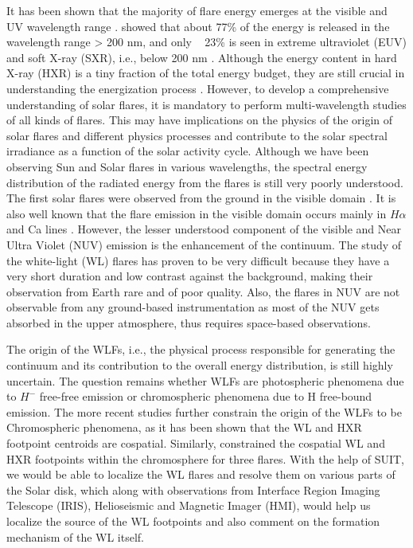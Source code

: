 It has been shown that the majority of flare energy emerges at the visible and UV wavelength range \citep{woods06}. \cite{woods04} showed that about 77\% of the energy is released in the wavelength range > 200 nm, and only ~ 23\% is seen in extreme ultraviolet (EUV) and soft X-ray (SXR), i.e., below 200 nm \citep{Nei_1989,neidig93,kretzschmar11}. Although the energy content in hard X-ray (HXR) is a tiny fraction of the total energy budget, they are still crucial in understanding the energization process \citep{holeman11}. However, to develop a comprehensive understanding of solar flares, it is mandatory to perform multi-wavelength studies of all kinds of flares. This may have implications on the physics of the origin of solar flares and different physics processes and contribute to the solar spectral irradiance as a function of the solar activity cycle. Although we have been observing Sun and Solar flares in various wavelengths, the spectral energy distribution of the radiated energy from the flares is still very poorly understood. The first solar flares were observed from the ground in the visible domain \citep{carrington1859,neidig93}. It is also well known that the flare emission in the visible domain occurs mainly in $H\alpha$ and Ca  lines \citep{canfield90,falchi92,heinzel94}. However, the lesser understood component of the visible and Near Ultra Violet (NUV) emission is the enhancement of the continuum. The study of the white-light (WL) flares has proven to be very difficult because they have a very short duration and low contrast against the background, making their observation from Earth rare and of poor quality. Also, the flares in NUV are not observable from any ground-based instrumentation as most of the NUV gets absorbed in the upper atmosphere, thus requires space-based observations.

The origin of the WLFs, i.e., the physical process responsible for generating the continuum and its contribution to the overall energy distribution, is still highly uncertain. The question remains whether WLFs are photospheric phenomena due to $H^{-}$ free-free emission or chromospheric phenomena due to H free-bound emission. The more recent studies further constrain the origin of the WLFs to be Chromospheric phenomena, as it has been shown that the WL and HXR footpoint centroids are cospatial. Similarly, \cite{krucker15} constrained the cospatial WL and HXR footpoints within the chromosphere for three flares. With the help of SUIT, we would be able to localize the WL flares and resolve them on various parts of the Solar disk, which along with observations from Interface Region Imaging Telescope (IRIS), Helioseismic and Magnetic Imager (HMI), would help us localize the source of the WL footpoints and also comment on the formation mechanism of the WL itself.

